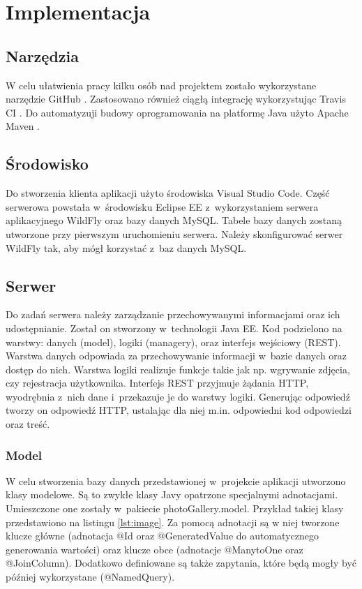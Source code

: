 \section{Implementacja}
\subsection{Narzędzia}
W celu ułatwienia pracy kilku osób nad projektem zostało wykorzystane narzędzie GitHub \cite{github}. Zastosowano również ciągłą integrację wykorzystując Travis CI \cite{travis}. Do automatyzuji budowy oprogramowania na platformę Java użyto Apache Maven \cite{maven}.

\subsection{Środowisko}
Do stworzenia klienta aplikacji użyto środowiska Visual Studio Code. Część serwerowa powstała w~środowisku Eclipse EE z~wykorzystaniem
serwera aplikacyjnego WildFly \cite{wildFly_doc} oraz bazy danych MySQL. Tabele bazy danych zostaną utworzone
przy pierwszym uruchomieniu serwera. Należy skonfigurować serwer WildFly tak, aby mógł korzystać z~baz danych MySQL. 

\subsection{Serwer}
Do zadań serwera należy zarządzanie przechowywanymi informacjami oraz ich
udostępnianie. Został on stworzony w~technologii Java EE. Kod podzielono na warstwy: danych (model), logiki (managery), oraz interfejs wejściowy (REST). Warstwa danych odpowiada za przechowywanie informacji w~bazie danych oraz dostęp do nich. Warstwa logiki realizuje funkcje takie jak np. wgrywanie zdjęcia, czy rejestracja użytkownika. Interfejs REST przyjmuje żądania HTTP, wyodrębnia z~nich dane i~przekazuje je do warstwy logiki. Generując odpowiedź tworzy on odpowiedź HTTP, ustalając dla niej m.in. odpowiedni kod odpowiedzi oraz treść.

\subsubsection{Model}
W celu stworzenia bazy danych przedstawionej w~projekcie aplikacji utworzono
klasy modelowe. Są to zwykłe klasy Javy opatrzone specjalnymi adnotacjami.
Umieszczone one zostały w~pakiecie photoGallery.model. Przykład takiej klasy
przedstawiono na listingu \ref{lst:image}. Za pomocą adnotacji są w
niej tworzone klucze główne (adnotacja @Id oraz @GeneratedValue do
automatycznego generowania wartości) oraz klucze obce (adnotacje @ManytoOne oraz
@JoinColumn). Dodatkowo definiowane są także zapytania,
które będą mogły być później
wykorzystane (@NamedQuery). 


